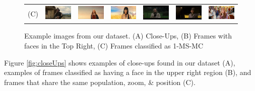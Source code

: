 \begin{figure}[t!]
\begin{center}
\begin{tabular}{ccccccc}
\large{(C)}
& \includegraphics[width=0.12\linewidth]
  {fig/clust/09.jpg} 
& \includegraphics[width=0.12\linewidth]
  {fig/clust/10.jpg}  
& \includegraphics[width=0.12\linewidth]
  {fig/clust/11.jpg}   
& \includegraphics[width=0.12\linewidth]
  {fig/clust/03.jpg} 
& \includegraphics[width=0.12\linewidth]
  {fig/clust/04.jpg}  
& \includegraphics[width=0.12\linewidth]
  {fig/clust/15.jpg}   
\\
\end{tabular}
\end{center}
   \caption{Example images from our dataset. (A) Close-Ups, (B) Frames with faces in the Top Right, (C) Frames classified as 1-MS-MC}
\label{fig:closeUps}
\label{fig:topRight}
\label{fig:cluster}
\end{figure}

Figure \ref{fig:closeUps} shows examples of close-ups found in our dataset (A), 
 examples of frames classified as having a face in the upper right region (B), and
 frames that share the same population, zoom, \& position (C).

